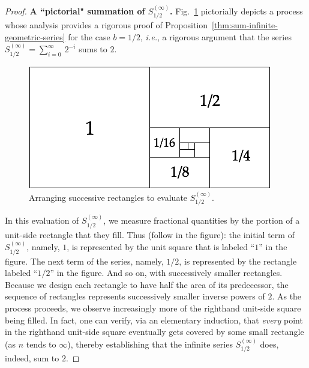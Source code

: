 \begin{proof}
{\bf A ``pictorial" summation of $S^{(\infty)}_{1/2}$.}
Fig.~\ref{fig:sumGeoBasis} pictorially depicts a process whose analysis provides a rigorous proof of Proposition~\ref{thm:sum-infinite-geometric-series} for the case $b = 1/2$, \textit{i.e.}, a rigorous argument that the series $S^{(\infty)}_{1/2} = \sum_{i=0}^\infty \ 2^{-i}$ sums to $2$.
\begin{figure}[htb]
\begin{center}
       \includegraphics[scale=0.35]{FiguresMaths/SumGeometric1sur2Bis}
 \caption{Arranging successive rectangles to evaluate $S^{(\infty)}_{1/2}$.}
       \label{fig:sumGeoBasis}
\end{center}
\end{figure}
In this evaluation of $S^{(\infty)}_{1/2}$, we measure fractional quantities by the portion of a unit-side rectangle that they fill.  Thus (follow in the figure): the initial term of $S^{(\infty)}_{1/2}$, namely, $1$, is represented by the unit square that is labeled ``$1$'' in the figure.  The next term of the series, namely, $1/2$, is represented by the rectangle labeled ``$1/2$'' in the figure.  And so on, with successively smaller rectangles.  Because we design each rectangle to have half the area of its predecessor, the sequence of rectangles represents successively smaller inverse powers of $2$.  As the process proceeds, we observe increasingly more of the righthand unit-side square being filled.  In fact, one can verify, via an elementary induction, that {\em every} point in the righthand unit-side square eventually gets covered by some small rectangle (as $n$ tends to $\infty$), thereby establishing that the infinite series $S^{(\infty)}_{1/2}$ does, indeed, sum to $2$.

\bigskip


\end{proof}
